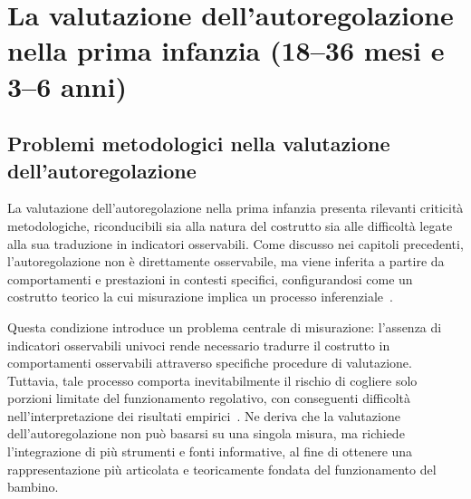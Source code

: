 \titlespacing*{\chapter}{0pt}{50pt}{60pt}
\chapter{La valutazione dell'autoregolazione nella prima infanzia (18--36 mesi e 3--6 anni)}
\titlespacing*{\chapter}{0pt}{50pt}{30pt}
\label{cap:tre}
    \section{Problemi metodologici nella valutazione dell'autoregolazione}
    \label{sec:3_1}

        La valutazione dell'autoregolazione nella prima infanzia presenta rilevanti criticità metodologiche, riconducibili sia alla natura del costrutto sia alle difficoltà legate alla sua traduzione in indicatori osservabili. Come discusso nei capitoli precedenti, l'autoregolazione non è direttamente osservabile, ma viene inferita a partire da comportamenti e prestazioni in contesti specifici, configurandosi come un costrutto teorico la cui misurazione implica un processo inferenziale~\cite{cole2004,blair2015}.

        Questa condizione introduce un problema centrale di misurazione: l'assenza di indicatori osservabili univoci rende necessario tradurre il costrutto in comportamenti osservabili attraverso specifiche procedure di valutazione. Tuttavia, tale processo comporta inevitabilmente il rischio di cogliere solo porzioni limitate del funzionamento regolativo, con conseguenti difficoltà nell'interpretazione dei risultati empirici~\cite{cole2004,blair2015}. Ne deriva che la valutazione dell'autoregolazione non può basarsi su una singola misura, ma richiede l'integrazione di più strumenti e fonti informative, al fine di ottenere una rappresentazione più articolata e teoricamente fondata del funzionamento del bambino.

